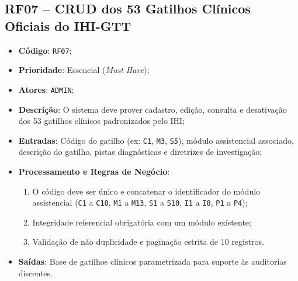 \subsection{RF07 -- CRUD dos 53 Gatilhos Clínicos Oficiais do IHI-GTT}
\begin{itemize}
    \item \textbf{Código}: \texttt{RF07};
    \item \textbf{Prioridade}: Essencial (\textit{Must Have});
    \item \textbf{Atores}: \texttt{ADMIN};
    \item \textbf{Descrição}: O sistema deve prover cadastro, edição, consulta e desativação dos 53 gatilhos clínicos padronizados pelo IHI;
    \item \textbf{Entradas}: Código do gatilho (ex: \texttt{C1}, \texttt{M3}, \texttt{S5}), módulo assistencial associado, descrição do gatilho, pistas diagnósticas e diretrizes de investigação;
    \item \textbf{Processamento e Regras de Negócio}:
    \begin{enumerate}
        \item O código deve ser único e concatenar o identificador do módulo assistencial (\texttt{C1} a \texttt{C18}, \texttt{M1} a \texttt{M13}, \texttt{S1} a \texttt{S10}, \texttt{I1} a \texttt{I8}, \texttt{P1} a \texttt{P4});
        \item Integridade referencial obrigatória com um módulo existente;
        \item Validação de não duplicidade e paginação estrita de 10 registros.
    \end{enumerate}
    \item \textbf{Saídas}: Base de gatilhos clínicos parametrizada para suporte às auditorias discentes.
\end{itemize}

